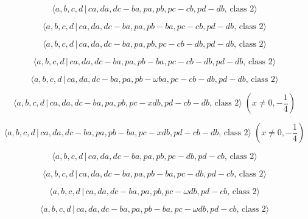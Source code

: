 \documentclass[10pt]{article}
\begin{document}
\begin{equation}
\langle a,b,c,d\,|\,ca,da,dc-ba,pa,pb,pc-cb,pd-db,\,\text{class }2\rangle 
\tag{7.3233}
\end{equation}

\begin{equation}
\langle a,b,c,d\,|\,ca,da,dc-ba,pa,pb-ba,pc-cb,pd-db,\,\text{class }2\rangle
\tag{7.3234}
\end{equation}

\begin{equation}
\langle a,b,c,d\,|\,ca,da,dc-ba,pa,pb,pc-cb-db,pd-db,\,\text{class }2\rangle
\tag{7.3235}
\end{equation}

\begin{equation}
\langle a,b,c,d\,|\,ca,da,dc-ba,pa,pb-ba,pc-cb-db,pd-db,\,\text{class }%
2\rangle  \tag{7.3236}
\end{equation}

\begin{equation}
\langle a,b,c,d\,|\,ca,da,dc-ba,pa,pb-\omega ba,pc-cb-db,pd-db,\,\text{class 
}2\rangle  \tag{7.3237}
\end{equation}

\begin{equation}
\langle a,b,c,d\,|\,ca,da,dc-ba,pa,pb,pc-xdb,pd-cb-db,\,\text{class }%
2\rangle \;(x\neq 0,-\frac{1}{4})  \tag{7.3238}
\end{equation}

\begin{equation}
\langle a,b,c,d\,|\,ca,da,dc-ba,pa,pb-ba,pc-xdb,pd-cb-db,\,\text{class }%
2\rangle \;(x\neq 0,-\frac{1}{4})  \tag{7.3239}
\end{equation}

\begin{equation}
\langle a,b,c,d\,|\,ca,da,dc-ba,pa,pb,pc-db,pd-cb,\,\text{class }2\rangle 
\tag{7.3240}
\end{equation}

\begin{equation}
\langle a,b,c,d\,|\,ca,da,dc-ba,pa,pb-ba,pc-db,pd-cb,\,\text{class }2\rangle
\tag{7.3241}
\end{equation}

\begin{equation}
\langle a,b,c,d\,|\,ca,da,dc-ba,pa,pb,pc-\omega db,pd-cb,\,\text{class }%
2\rangle  \tag{7.3242}
\end{equation}

\begin{equation}
\langle a,b,c,d\,|\,ca,da,dc-ba,pa,pb-ba,pc-\omega db,pd-cb,\,\text{class }%
2\rangle  \tag{7.3243}
\end{equation}
\end{document}

